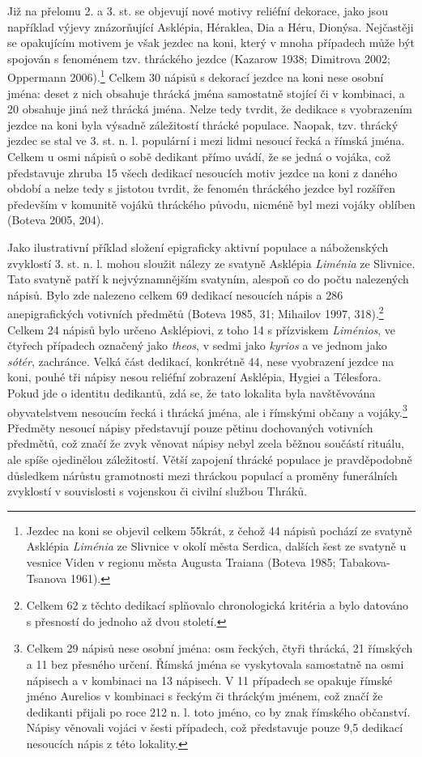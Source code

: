 Již na přelomu 2. a 3. st. se objevují nové motivy reliéfní dekorace, jako jsou například výjevy znázorňující Asklépia, Héraklea, Dia a Héru, Dionýsa. Nejčastěji se opakujícím motivem je však jezdec na koni, který v mnoha případech může být spojován s fenoménem tzv. thráckého jezdce (Kazarow 1938; Dimitrova 2002; Oppermann 2006).\footnote{Jezdec na koni se objevil celkem 55krát, z čehož 44 nápisů pochází ze svatyně Asklépia {\em Liménia} ze Slivnice v okolí města Serdica, dalších šest ze svatyně u vesnice Viden v regionu města Augusta Traiana (Boteva 1985; Tabakova-Tsanova 1961).} Celkem 30 nápisů s dekorací jezdce na koni nese osobní jména: deset z nich obsahuje thrácká jména samostatně stojící či v kombinaci, a 20 obsahuje jiná než thrácká jména. Nelze tedy tvrdit, že dedikace s vyobrazením jezdce na koni byla výsadně záležitostí thrácké populace. Naopak, tzv. thrácký jezdec se stal ve 3. st. n. l. populární i mezi lidmi nesoucí řecká a římská jména. Celkem u osmi nápisů o sobě dedikant přímo uvádí, že se jedná o vojáka, což představuje zhruba 15  všech dedikací nesoucích motiv jezdce na koni z daného období a nelze tedy s jistotou tvrdit, že fenomén thráckého jezdce byl rozšířen především v komunitě vojáků thráckého původu, nicméně byl mezi vojáky oblíben (Boteva 2005, 204).

Jako ilustrativní příklad složení epigraficky aktivní populace a náboženských zvyklostí 3. st. n. l. mohou sloužit nálezy ze svatyně Asklépia {\em Liménia} ze Slivnice. Tato svatyně patří k nejvýznamnějším svatyním, alespoň co do počtu nalezených nápisů. Bylo zde nalezeno celkem 69 dedikací nesoucích nápis a 286 anepigrafických votivních předmětů (Boteva 1985, 31; Mihailov 1997, 318).\footnote{Celkem 62 z těchto dedikací splňovalo chronologická kritéria a bylo datováno s přesností do jednoho až dvou století.} Celkem 24 nápisů bylo určeno Asklépiovi, z toho 14 s přízviskem {\em Liménios}, ve čtyřech případech označený jako {\em theos}, v sedmi jako {\em kyrios} a ve jednom jako {\em sótér}, zachránce. Velká část dedikací, konkrétně 44, nese vyobrazení jezdce na koni, pouhé tři nápisy nesou reliéfní zobrazení Asklépia, Hygiei a Télesfora. Pokud jde o identitu dedikantů, zdá se, že tato lokalita byla navštěvována obyvatelstvem nesoucím řecká i thrácká jména, ale i římskými občany a vojáky.\footnote{Celkem 29 nápisů nese osobní jména: osm řeckých, čtyři thrácká, 21 římských a 11 bez přesného určení. Římská jména se vyskytovala samostatně na osmi nápisech a v kombinaci na 13 nápisech. V 11 případech se opakuje římské jméno Aurelios v kombinaci s řeckým či thráckým jménem, což značí že dedikanti přijali po roce 212 n. l. toto jméno, co by znak římského občanství. Nápisy věnovali vojáci v šesti případech, což představuje pouze 9,5  dedikací nesoucích nápis z této lokality.} Předměty nesoucí nápisy představují pouze pětinu dochovaných votivních předmětů, což značí že zvyk věnovat nápisy nebyl zcela běžnou součástí rituálu, ale spíše ojedinělou záležitostí. Větší zapojení thrácké populace je pravděpodobně důsledkem nárůstu gramotnosti mezi thráckou populací a proměny funerálních zvyklostí v souvislosti s vojenskou či civilní službou Thráků.

